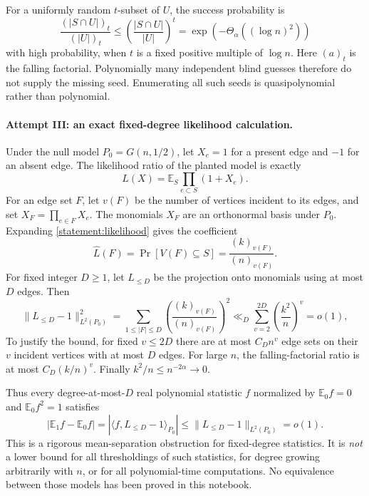 \documentclass[11pt,a4paper]{article}
\newcommand{\E}{\mathbb{E}}
\numberwithin{equation}{section}
\begin{document}
For a uniformly random $t$-subset of $U$, the success probability is
\[
 \frac{(|S\cap U|)_t}{(|U|)_t}
 \leq\left(\frac{|S\cap U|}{|U|}\right)^t
 =\exp(-\Theta_\alpha((\log n)^2))
\]
with high probability, when $t$ is a fixed positive multiple of
$\log n$.  Here $(a)_t$ is the falling factorial.  Polynomially many
independent blind guesses therefore do not supply the missing seed.
Enumerating all such seeds is quasipolynomial rather than polynomial.

\paragraph{Attempt III: an exact fixed-degree likelihood calculation.}
Under the null model $P_0=G(n,1/2)$, let $X_e=1$ for a present edge
and $-1$ for an absent edge.  The likelihood ratio of the planted
model is exactly
\begin{equation}\label{statement:likelihood}
 L(X)=\E_S\prod_{e\subset S}(1+X_e).
\end{equation}
For an edge set $F$, let $v(F)$ be the number of vertices incident to
its edges, and set $X_F=\prod_{e\in F}X_e$.  The monomials $X_F$ are
an orthonormal basis under $P_0$.  Expanding \eqref{statement:likelihood}
gives the coefficient
\[
 \widehat L(F)=\Pr[V(F)\subseteq S]=\frac{(k)_{v(F)}}{(n)_{v(F)}}.
\]
For fixed integer $D\geq1$, let $L_{\leq D}$ be the projection onto
monomials using at most $D$ edges.  Then
\begin{equation}\label{statement:lowdegree}
 \|L_{\leq D}-1\|_{L^2(P_0)}^2
 =\sum_{1\leq|F|\leq D}
       \left(\frac{(k)_{v(F)}}{(n)_{v(F)}}\right)^2
 \ll_D\sum_{v=2}^{2D}\left(\frac{k^2}{n}\right)^v=o(1),
\end{equation}
To justify the bound, for fixed $v\leq2D$ there are at most
$C_D n^v$ edge sets on their $v$ incident vertices with at most $D$
edges.  For large $n$, the falling-factorial ratio is at most
$C_D(k/n)^v$.  Finally $k^2/n\leq n^{-2\alpha}\to0$.

Thus every degree-at-most-$D$ real polynomial statistic $f$ normalized
by $\E_0f=0$ and $\E_0f^2=1$ satisfies
\[
 |\E_1f-\E_0f|
   =|\langle f,L_{\leq D}-1\rangle_{P_0}|
   \leq\|L_{\leq D}-1\|_{L^2(P_0)}=o(1).
\]
This is a rigorous mean-separation obstruction for fixed-degree
statistics.  It is \emph{not} a lower bound for all thresholdings of
such statistics, for degree growing arbitrarily with $n$, or for
all polynomial-time computations.  No equivalence between those
models has been proved in this notebook.
\end{document}
